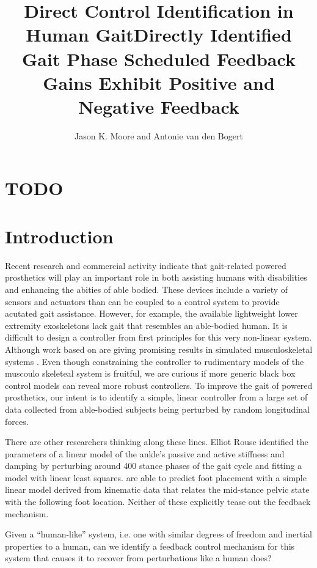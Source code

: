 \documentclass{article}
\author{Jason K. Moore and Antonie van den Bogert}
\title{Direct Control Identification in Human Gait}
\title{Directly Identified Gait Phase Scheduled Feedback Gains Exhibit Positive
  and Negative Feedback}
\date{}
\begin{document}
\maketitle

\section*{TODO}

\listoftodos

\begin{abstract}
\end{abstract}

\section*{Introduction}
%
Recent research and commercial activity indicate that gait-related powered
prosthetics will play an important role in both assisting humans with
disabilities and enhancing the abities of able bodied. These devices include a
variety of sensors and actuators than can be coupled to a control system to
provide acutated gait assistance. However, for example, the available
lightweight lower extremity exoskeletons lack gait that resembles an
able-bodied human. It is difficult to design a controller from first principles
for this very non-linear system. Although work based on \cite{Geyer2010} are
giving promising results in simulated musculoskeletal systems \cite{Wang2010,
Geitenbeek2014}. Even though constraining the controller to rudimentary models
of the muscoulo skeleteal system is fruitful, we are curious if more generic
black box control models can reveal more robust controllers. To improve the
gait of powered prosthetics, our intent is to identify a simple, linear
controller from a large set of data collected from able-bodied subjects being
perturbed by random longitudinal forces.

There are other researchers thinking along these lines. Elliot Rouse identified
the parameters of a linear model of the ankle's passive and active stiffness
and damping by perturbing around 400 stance phases of the gait cycle and
fitting a model with linear least squares. \cite{Wang2013} are able to predict
foot placement with a simple linear model derived from kinematic data that
relates the mid-stance pelvic state with the following foot location. Neither
of these explicitly tease out the feedback mechanism.

Given a ``human-like'' system, i.e. one with similar degrees of freedom and
inertial properties to a human, can we identify a feedback control mechanism
for this system that causes it to recover from perturbations like a human does?
\end{document}
